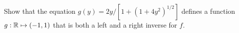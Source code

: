 \documentclass[main.tex]{subfiles}
\begin{document}
\subproblem{}\label{s03p10b}

Show that the equation \(g(y) = 2y/[1 + {{(1 + 4{y^2})}^{1/2}}]\) defines a
function \({g}: {\mathbb{R}} \mapsto{} {({-1},{1})}\) that is both a left and
a right inverse for \(f\).

\todo{}
\end{document}

